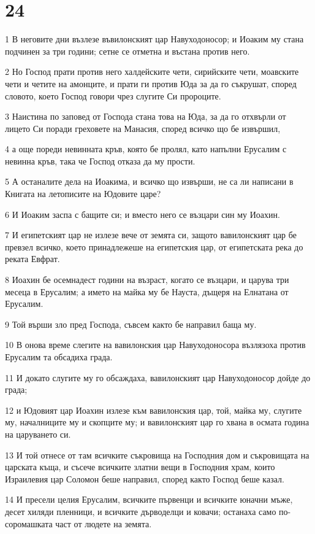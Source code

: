 \chapter{24}

\par 1 В неговите дни възлезе въвилонският цар Навуходоносор; и Иоаким му стана подчинен за три години; сетне се отметна и въстана против него.
\par 2 Но Господ прати против него халдейските чети, сирийските чети, моавските чети и четите на амонците, и прати ги против Юда за да го съкрушат, според словото, което Господ говори чрез слугите Си пророците.
\par 3 Наистина по заповед от Господа стана това на Юда, за да го отхвърли от лицето Си поради греховете на Манасия, според всичко що бе извършил,
\par 4 а още пореди невинната кръв, която бе пролял, като напълни Ерусалим с невинна кръв, така че Господ отказа да му прости.
\par 5 А останалите дела на Иоакима, и всичко що извърши, не са ли написани в Книгата на летописите на Юдовите царе?
\par 6 И Иоаким заспа с бащите си; и вместо него се възцари син му Иоахин.
\par 7 И египетският цар не излезе вече от земята си, защото вавилонският цар бе превзел всичко, което принадлежеше на египетския цар, от египетската река до реката Евфрат.
\par 8 Иоахин бе осемнадест години на възраст, когато се възцари, и царува три месеца в Ерусалим; а името на майка му бе Науста, дъщеря на Елнатана от Ерусалим.
\par 9 Той върши зло пред Господа, съвсем както бе направил баща му.
\par 10 В онова време слегите на вавилонския цар Навуходоносора възлязоха против Ерусалим та обсадиха града.
\par 11 И докато слугите му го обсаждаха, вавилонският цар Навуходоносор дойде до града;
\par 12 и Юдовият цар Иоахин излезе към вавилонския цар, той, майка му, слугите му, началниците му и скопците му; и вавилонският цар го хвана в осмата година на царуването си.
\par 13 И той отнесе от там всичките съкровища на Господния дом и съкровищата на царската къща, и съсече всичките златни вещи в Господния храм, които Израилевия цар Соломон беше направил, според както Господ беше казал.
\par 14 И пресели целия Ерусалим, всичките първенци и всичките юначни мъже, десет хиляди пленници, и всичките дърводелци и ковачи; останаха само по-соромашката част от людете на земята.
